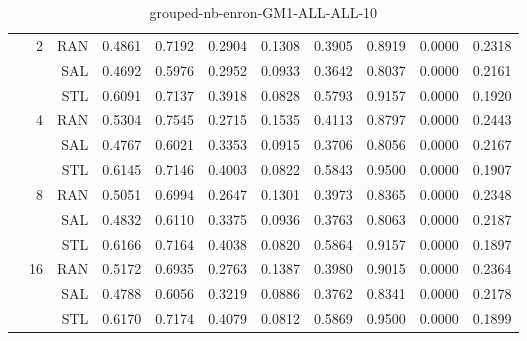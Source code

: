 \begin{center}
\begin{table}[htbp]
\begin{tabular}{ | r | r | r | r | r | r | r | r | r | r | r |}
 & \multirow{3}{*}{2} & RAN & 0.4861 & 0.7192 & 0.2904 & 0.1308 & 0.3905 & 0.8919 & 0.0000 & 0.2318\\ \cline{3-11}
 &   & SAL & 0.4692 & 0.5976 & 0.2952 & 0.0933 & 0.3642 & 0.8037 & 0.0000 & 0.2161\\ \cline{3-11}
 &   & STL & 0.6091 & 0.7137 & 0.3918 & 0.0828 & 0.5793 & 0.9157 & 0.0000 & 0.1920\\ \cline{2-11}
 & \multirow{3}{*}{4} & RAN & 0.5304 & 0.7545 & 0.2715 & 0.1535 & 0.4113 & 0.8797 & 0.0000 & 0.2443\\ \cline{3-11}
 &   & SAL & 0.4767 & 0.6021 & 0.3353 & 0.0915 & 0.3706 & 0.8056 & 0.0000 & 0.2167\\ \cline{3-11}
 &   & STL & 0.6145 & 0.7146 & 0.4003 & 0.0822 & 0.5843 & 0.9500 & 0.0000 & 0.1907\\ \cline{2-11}
 & \multirow{3}{*}{8} & RAN & 0.5051 & 0.6994 & 0.2647 & 0.1301 & 0.3973 & 0.8365 & 0.0000 & 0.2348\\ \cline{3-11}
 &   & SAL & 0.4832 & 0.6110 & 0.3375 & 0.0936 & 0.3763 & 0.8063 & 0.0000 & 0.2187\\ \cline{3-11}
 &   & STL & 0.6166 & 0.7164 & 0.4038 & 0.0820 & 0.5864 & 0.9157 & 0.0000 & 0.1897\\ \cline{2-11}
 & \multirow{3}{*}{16} & RAN & 0.5172 & 0.6935 & 0.2763 & 0.1387 & 0.3980 & 0.9015 & 0.0000 & 0.2364\\ \cline{3-11}
 &   & SAL & 0.4788 & 0.6056 & 0.3219 & 0.0886 & 0.3762 & 0.8341 & 0.0000 & 0.2178\\ \cline{3-11}
 &   & STL & 0.6170 & 0.7174 & 0.4079 & 0.0812 & 0.5869 & 0.9500 & 0.0000 & 0.1899\\ \cline{2-11}
\hline
\end{tabular}
\caption{grouped-nb-enron-GM1-ALL-ALL-10}
\end{table}
\end{center}

